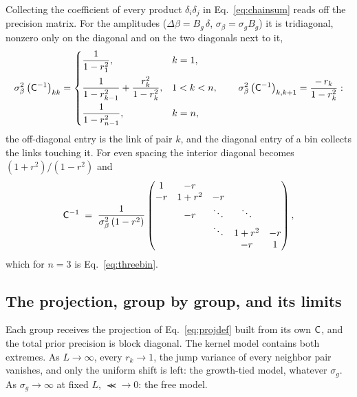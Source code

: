Collecting the coefficient of every product $\delta_i\delta_j$ in
Eq.~\eqref{eq:chainsum} reads off the precision matrix.  For the
amplitudes ($\Delta\beta = B_g\,\delta$, $\sigma_\beta = \sigma_g B_g$)
it is tridiagonal, nonzero only on the diagonal and on the two
diagonals next to it,
\begin{equation}
  \sigma_\beta^2\,\bigl(\mathsf{C}^{-1}\bigr)_{kk} =
  \begin{cases}
    \dfrac{1}{1 - r_1^2}, & k = 1,\\[2.2ex]
    \dfrac{1}{1 - r_{k-1}^2} + \dfrac{r_k^2}{1 - r_k^2}, & 1 < k < n,\\[2.2ex]
    \dfrac{1}{1 - r_{n-1}^2}, & k = n,
  \end{cases}
  \qquad
  \sigma_\beta^2\,\bigl(\mathsf{C}^{-1}\bigr)_{k, k+1} = \frac{-\,r_k}{1 - r_k^2}:
  \label{eq:uneven}
\end{equation}
the off-diagonal entry is the link of pair $k$, and the diagonal entry
of a bin collects the links touching it.  For even spacing the interior
diagonal becomes $(1 + r^2)/(1 - r^2)$ and
\begin{equation}
  \mathsf{C}^{-1} \;=\;
  \frac{1}{\sigma_\beta^2\,(1 - r^2)}
  \begin{pmatrix}
    1      & -r     &        &        &        \\
    -r     & 1+r^2  & -r     &        &        \\
           & -r     & \ddots & \ddots &        \\
           &        & \ddots & 1+r^2  & -r     \\
           &        &        & -r     & 1
  \end{pmatrix},
  \label{eq:ar1}
\end{equation}
which for $n = 3$ is Eq.~\eqref{eq:threebin}.

\subsection{The projection, group by group, and its limits}
\label{sec:projgroups}

Each group receives the projection of Eq.~\eqref{eq:projdef} built
from its own $\mathsf{C}$, and the total prior precision is block diagonal.
\label{sec:limits}
The kernel model contains both extremes.  As $L \to \infty$, every
$r_k \to 1$, the jump variance of every neighbor pair vanishes, and
only the uniform shift is left: the growth-tied model, whatever
$\sigma_g$.  As $\sigma_g \to \infty$ at fixed $L$, $\Prec \to 0$: the
free model.

